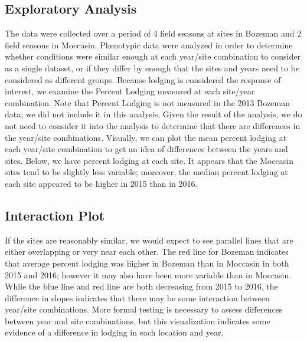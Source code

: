 \documentclass[11pt]{article}\usepackage[]{graphicx}\usepackage[]{color}
\begin{document}
\subsection{Exploratory Analysis} 
The data were collected over a period of 4 field seasons at sites in Bozeman and 2 field seasons in Moccasin. Phenotypic data were analyzed in order to determine whether conditions were similar enough at each year/site combination to consider as a single dataset, or if they differ by enough that the sites and years need to be considered as different groups.  
Because lodging is considered the response of interest, we examine the Percent Lodging measured at each site/year combination. Note that Percent Lodging is not measured in the 2013 Bozeman data; we did not include it in this analysis. Given the result of the analysis, we do not need to consider it into the analysis to determine that there are differences in the year/site combinations.  Visually, we can plot the mean percent lodging at each year/site combination to get an idea of differences between the years and sites. Below, we have percent lodging at each site. It appears that the Moccasin sites tend to be slightly less variable; moreover, the median percent lodging at each site appeared to be higher in 2015 than in 2016.




\subsection{Interaction Plot}
If the sites are reasonably similar, we would expect to see parallel lines that are either overlapping or very near each other.  The red line for Bozeman indicates that average percent lodging was higher in Bozeman than in Moccasin in both 2015 and 2016; however it may also have been more variable than in Moccasin. While the blue line and red line are both decreasing from 2015 to 2016, the difference in slopes indicates that there may be some interaction between year/site combinations.  More formal testing is necessary to assess differences between year and site combinations, but this visualization indicates some evidence of a difference in lodging in each location and year.
\end{document}
